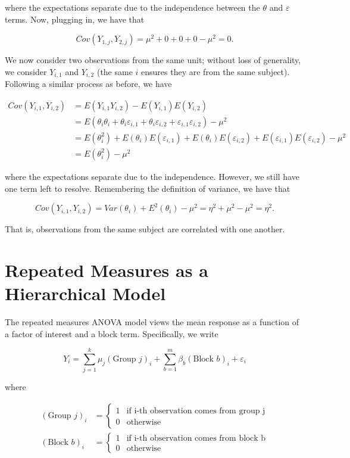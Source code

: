 \documentclass[
  letterpaper,
  DIV=11,
  numbers=noendperiod]{scrreprt}
\theoremstyle{definition}
\theoremstyle{plain}
\theoremstyle{definition}
\theoremstyle{remark}
\begin{document}
where the expectations separate due to the independence between the
\(\theta\) and \(\varepsilon\) terms. Now, plugging in, we have that

\[Cov\left(Y_{1,j}, Y_{2,j}\right) = \mu^2 + 0 + 0 + 0 - \mu^2 = 0.\]

We now consider two observations from the same unit; without loss of
generality, we consider \(Y_{i,1}\) and \(Y_{i,2}\) (the same \(i\)
ensures they are from the same subject). Following a similar process as
before, we have

\[
\begin{aligned}
  Cov\left(Y_{i,1}, Y_{i,2}\right)
    &= E\left(Y_{i,1} Y_{i,2}\right) - E\left(Y_{i,1}\right)E\left(Y_{i,2}\right) \\
    &= E\left(\theta_i\theta_i + \theta_i \varepsilon_{i,1} + \theta_i \varepsilon_{i,2} + \varepsilon_{i,1}\varepsilon_{i,2}\right) - \mu^2 \\
    &= E\left(\theta_i^2\right) + E\left(\theta_i\right) E\left(\varepsilon_{i,1}\right) + E\left(\theta_i\right) E\left(\varepsilon_{i,2}\right) + E\left(\varepsilon_{i,1}\right)E\left(\varepsilon_{i,2}\right) - \mu^2 \\
    &= E\left(\theta_i^2\right) - \mu^2
\end{aligned}
\]

where the expectations separate due to the independence. However, we
still have one term left to resolve. Remembering the definition of
variance, we have that

\[Cov\left(Y_{i,1}, Y_{i,2}\right) = Var\left(\theta_i\right) + E^2\left(\theta_i\right) - \mu^2 = \eta^2 + \mu^2 - \mu^2 = \eta^2.\]

That is, observations from the same subject are correlated with one
another.

\section{Repeated Measures as a Hierarchical
Model}\label{repeated-measures-as-a-hierarchical-model}

The repeated measures ANOVA model views the mean response as a function
of a factor of interest and a block term. Specifically, we write

\[Y_i = \sum_{j=1}^{k} \mu_j (\text{Group } j)_i + \sum_{b=1}^{m} \beta_b (\text{Block } b)_i + \varepsilon_i\]

where

\[
\begin{aligned}
  (\text{Group } j)_i 
    &= \begin{cases}
      1 & \text{if i-th observation comes from group j} \\
      0 & \text{otherwise}
      \end{cases} \\
  (\text{Block } b)_i
    &= \begin{cases}
      1 & \text{if i-th observation comes from block b} \\
      0 & \text{otherwise}
      \end{cases}
\end{aligned}
\]
\end{document}
